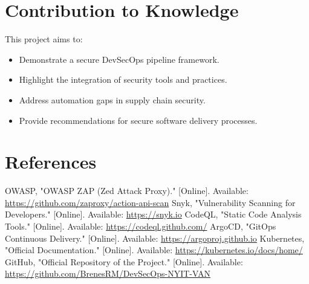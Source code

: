 \documentclass[conference]{IEEEtran}
\begin{document}
\section{Contribution to Knowledge}
This project aims to:
\begin{itemize}
    \item Demonstrate a secure DevSecOps pipeline framework.
    \item Highlight the integration of security tools and practices.
    \item Address automation gaps in supply chain security.
    \item Provide recommendations for secure software delivery processes.
\end{itemize}

\section{References}
\begin{thebibliography}{1}
     OWASP, "OWASP ZAP (Zed Attack Proxy)." [Online]. Available: \url{https://github.com/zaproxy/action-api-scan}
     Snyk, "Vulnerability Scanning for Developers." [Online]. Available: \url{https://snyk.io}
     CodeQL, "Static Code Analysis Tools." [Online]. Available: \url{https://codeql.github.com/}
     ArgoCD, "GitOps Continuous Delivery." [Online]. Available: \url{https://argoproj.github.io}
     Kubernetes, "Official Documentation." [Online]. Available: \url{https://kubernetes.io/docs/home/}
     GitHub, "Official Repository of the Project." [Online]. Available: \url{https://github.com/BrenesRM/DevSecOps-NYIT-VAN}
\end{thebibliography}
\end{document}
